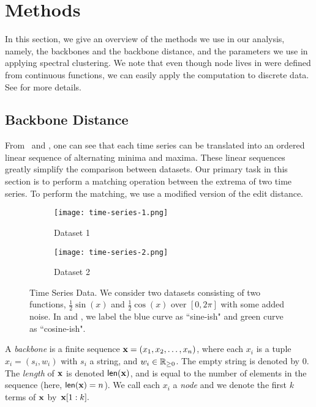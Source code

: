 \section{Methods}

In this section, we give an overview of the methods we use in our analysis, namely, the backbones and the backbone distance, and the parameters we use in applying spectral clustering. We note that even though node lives in  were defined from continuous functions, we can easily apply the computation to discrete data. See \cite{BeltonExtremal22} for more details.

\subsection{Backbone Distance}

From~ and , one can see that each time series can be translated
into an ordered linear sequence of alternating minima and maxima. These linear
sequences greatly simplify the comparison between datasets. Our primary task in this section is to perform a matching operation
between the extrema of two time series. To perform the
matching, we use a modified version of the edit distance. 

\begin{figure}[htp]
     \centering
     \begin{subfigure}[b]{0.4\textwidth}
         \centering
         \texttt{[image: time-series-1.png]}
         \caption{Dataset 1}
         \label{fig:timeseries1}
     \end{subfigure}
     \hfill
     \begin{subfigure}[b]{0.4\textwidth}
         \centering
         \texttt{[image: time-series-2.png]}
         \caption{Dataset 2}
         \label{fig:timeseries2}
     \end{subfigure} 

        \caption{Time Series Data. We consider two datasets consisting of two functions, $\frac{1}{2}\sin(x)$ and
        $\frac{1}{2}\cos(x)$ over $[0, 2\pi]$ with some added noise. In
         and , we label the blue curve
        as ``sine-ish" and green curve as ``cosine-ish". }        
        \label{fig:time-series-and-dags}
\end{figure}

\begin{defn}[Backbones] A \emph{backbone} is a finite sequence $\textbf{x} = (x_1, x_2,
    \dots , x_n)$, where each $x_i$ is a tuple~$x_i=(s_i, w_i)$ with $s_i$ a string, and $w_i \in
    \mathbb{R}_{\geq 0}$. The empty string is denoted by 0.
    The \emph{length} of $\textbf{x}$ is denoted $\operatorname{\textsf{len}}(\textbf{x})$, and is equal to the
    number of elements in the sequence (here, $\operatorname{\textsf{len}}(\textbf{x})=n$).
    We call each $x_i$ a
    \emph{node} and we denote the first $k$ terms of $\textbf{x}$ by~$\textbf{x}[1:k].$
\label{def:backbone}
\end{defn}

